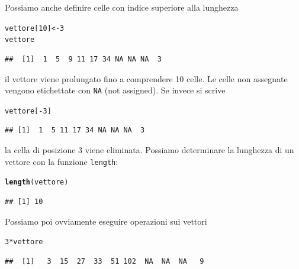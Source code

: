 \documentclass[onecolumn,11pt]{book}\usepackage[]{graphicx}\usepackage[]{color}
\makeatletter
\newcommand{\hlnum}[1]{\textcolor[rgb]{0.686,0.059,0.569}{#1}}%
\newcommand{\hlopt}[1]{\textcolor[rgb]{0,0,0}{#1}}%
\newcommand{\hlstd}[1]{\textcolor[rgb]{0.345,0.345,0.345}{#1}}%
\newcommand{\hlkwb}[1]{\textcolor[rgb]{0.69,0.353,0.396}{#1}}%
\newcommand{\hlkwd}[1]{\textcolor[rgb]{0.737,0.353,0.396}{\textbf{#1}}}%
\newenvironment{kframe}{%
 \def\at@end@of@kframe{}%
 \ifinner\ifhmode%
  \def\at@end@of@kframe{\end{minipage}}%
  \begin{minipage}{\columnwidth}%
 \fi\fi%
 \def\FrameCommand##1{\hskip\@totalleftmargin \hskip-\fboxsep
 \colorbox{shadecolor}{##1}\hskip-\fboxsep
     \hskip-\linewidth \hskip-\@totalleftmargin \hskip\columnwidth}%
 \MakeFramed {\advance\hsize-\width
   \@totalleftmargin\z@ \linewidth\hsize
   \@setminipage}}%
 {\par\unskip\endMakeFramed%
 \at@end@of@kframe}
\newenvironment{knitrout}{}{} %
\makeatother
\begin{document}
Possiamo anche definire celle con indice superiore alla lunghezza
\begin{knitrout}
\color{fgcolor}\begin{kframe}
\begin{alltt}
\hlstd{vettore[}\hlnum{10}\hlstd{]}\hlkwb{<-}\hlnum{3}
\hlstd{vettore}
\end{alltt}
\begin{verbatim}
##  [1]  1  5  9 11 17 34 NA NA NA  3
\end{verbatim}
\end{kframe}
\end{knitrout}
 il vettore viene prolungato fino a comprendere 10 celle. Le celle non assegnate vengono etichettate con \texttt{NA} (not assigned).
 Se invece si scrive
\begin{knitrout}
\color{fgcolor}\begin{kframe}
\begin{alltt}
\hlstd{vettore[}\hlopt{-}\hlnum{3}\hlstd{]}
\end{alltt}
\begin{verbatim}
## [1]  1  5 11 17 34 NA NA NA  3
\end{verbatim}
\end{kframe}
\end{knitrout}
la cella di posizione 3 viene eliminata.
Possiamo determinare la lunghezza di un vettore con la funzione \texttt{length}:
\begin{knitrout}
\color{fgcolor}\begin{kframe}
\begin{alltt}
\hlkwd{length}\hlstd{(vettore)}
\end{alltt}
\begin{verbatim}
## [1] 10
\end{verbatim}
\end{kframe}
\end{knitrout}
 Possiamo poi ovviamente eseguire operazioni sui vettori
\begin{knitrout}
\color{fgcolor}\begin{kframe}
\begin{alltt}
\hlnum{3}\hlopt{*}\hlstd{vettore}
\end{alltt}
\begin{verbatim}
##  [1]   3  15  27  33  51 102  NA  NA  NA   9
\end{verbatim}
\end{kframe}
\end{knitrout}
\end{document}
